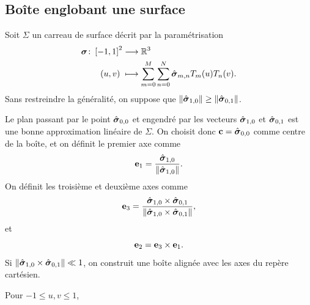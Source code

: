 \subsection{Boîte englobant une surface}
Soit $\Sigma$ un carreau de surface décrit par la paramétrisation 
\begin{align}
  \boldsymbol{\sigma} \colon \left[ -1, 1 \right]^2 &\longrightarrow \mathbb{R}^3 \nonumber \\
  (u,v)\; &\longmapsto \sum_{m=0}^{M} \sum_{n=0}^{N} \hat{\boldsymbol{\sigma}}_{m,n} T_m(u) T_n(v).
\end{align}
%
Sans restreindre la généralité, on suppose que $\left\| {\hat{\boldsymbol{\sigma}}_{1,0}} \right\| \geq \left\| {\hat{\boldsymbol{\sigma}}_{0,1}} \right\|$.
\par
Le plan passant par le point $\hat{\boldsymbol{\sigma}}_{0,0}$ et engendré par les vecteurs $\hat{\boldsymbol{\sigma}}_{1,0}$ et $\hat{\boldsymbol{\sigma}}_{0,1}$ est une bonne approximation linéaire de $\Sigma$. 
On choisit donc $\mathbf{c} = \hat{\boldsymbol{\sigma}}_{0,0}$ comme centre de la boîte, et on définit le premier axe comme
\begin{equation}
	\mathbf{e}_1 = \frac{\hat{\boldsymbol{\sigma}}_{1,0}}{\left\| {\hat{\boldsymbol{\sigma}}_{1,0}} \right\|}.
\end{equation}
On définit les troisième et deuxième axes comme 
\begin{equation}
	\mathbf{e}_3 = \frac{{\hat{\boldsymbol{\sigma}}_{1,0}} \times {\hat{\boldsymbol{\sigma}}_{0,1}}}{\left\| {{\hat{\boldsymbol{\sigma}}_{1,0}} \times {\hat{\boldsymbol{\sigma}}_{0,1}}} \right\|},
\end{equation}
et
\begin{equation}
	\mathbf{e}_2 = {\mathbf{e}_3} \times {\mathbf{e}_1}.
\end{equation}
Si $\left\| {{\hat{\boldsymbol{\sigma}}_{1,0}} \times {\hat{\boldsymbol{\sigma}}_{0,1}}} \right\| \ll 1$, on construit une boîte alignée avec les axes du repère cartésien.
\par
Pour $-1 \leq u, v \leq 1$,
